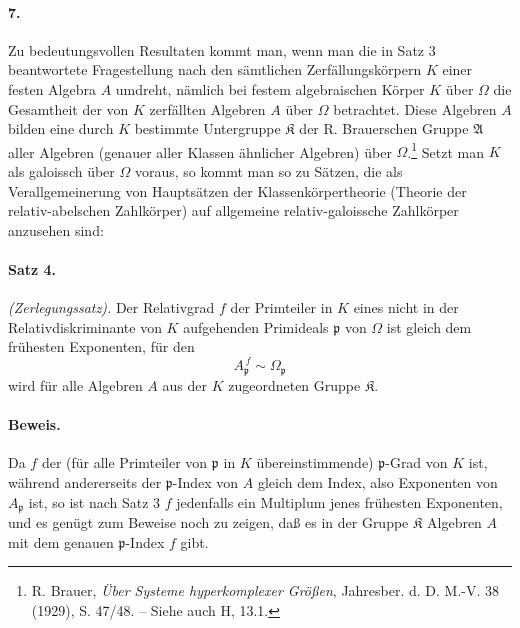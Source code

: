 
\paragraph{7.}
Zu bedeutungsvollen Resultaten kommt man, wenn man die in Satz 3 beantwortete Fragestellung nach den sämtlichen Zerfällungskörpern \(K\) einer festen Algebra \(A\) umdreht, nämlich bei festem algebraischen Körper \(K\) über \(\Omega\) die Gesamtheit der von \(K\) zerfällten Algebren \(A\) über \(\Omega\) betrachtet. Diese Algebren \(A\) bilden eine durch \(K\) bestimmte Untergruppe \(\mathfrak K\) der R. Brauerschen Gruppe \(\mathfrak A\) aller Algebren (genauer aller Klassen ähnlicher Algebren) über \(\Omega\).\footnote{R. Brauer, \emph{Über Systeme hyperkomplexer Größen}, Jahresber. d. D. M.-V. 38 (1929), S. 47/48. -- Siehe auch H, 13.1.} Setzt man \(K\) als galoissch über \(\Omega\) voraus, so kommt man so zu Sätzen, die als Verallgemeinerung von Hauptsätzen der Klassenkörpertheorie (Theorie der relativ-abelschen Zahlkörper) auf allgemeine relativ-galoissche Zahlkörper anzusehen sind:

\paragraph{Satz 4.}
\emph{(Zerlegungssatz).} Der Relativgrad \(f\) der Primteiler in \(K\) eines nicht in der Relativdiskriminante von \(K\) aufgehenden Primideals \(\mathfrak p\) von \(\Omega\) ist gleich dem frühesten Exponenten, für den
\[
        A_{\mathfrak p}^{\,f}\sim\Omega_{\mathfrak p}
\]
wird für alle Algebren \(A\) aus der \(K\) zugeordneten Gruppe \(\mathfrak K\).

\paragraph{Beweis.}
Da \(f\) der (für alle Primteiler von \(\mathfrak p\) in \(K\) übereinstimmende) \(\mathfrak p\)-Grad von \(K\) ist, während andererseits der \(\mathfrak p\)-Index von \(A\) gleich dem Index, also Exponenten von \(A_{\mathfrak p}\) ist, so ist nach Satz 3 \(f\) jedenfalls ein Multiplum jenes frühesten Exponenten, und es genügt zum Beweise noch zu zeigen, daß es in der Gruppe \(\mathfrak K\) Algebren \(A\) mit dem genauen \(\mathfrak p\)-Index \(f\) gibt.

